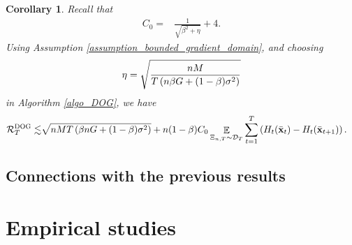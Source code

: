 \documentclass{article}
\newtheorem{Corollary}{\bf{Corollary}}
\newtheorem{Assumption}{\bf{Assumption}}
\begin{document}
\begin{Corollary}
\label{corollary_regret_upper_bound}
Recall that 
\begin{align}
\nonumber
C_0 = & \frac{1}{\sqrt{\beta^2 + \eta}} + 4.
\end{align}
Using Assumption \ref{assumption_bounded_gradient_domain}, and choosing 
\begin{align}
\nonumber
\eta = \sqrt{\frac{nM}{ T\left( n\beta G + (1-\beta)\sigma^2 \right) }}
\end{align} in Algorithm \ref{algo_DOG}, we have
\begin{align}
\nonumber
{\mathcal{R}}_T^{\textsc{DOG}} \lesssim & \sqrt{nMT\left( \beta nG + (1-\beta)\sigma^2 \right)} + n(1-\beta)C_0  \mathop{\mathbb{E}}_{ \Xi_{n,T} \sim \mathcal{D}_{T} } \sum_{t=1}^T  \left( H_t(\bar{{\bf x}}_t) - H_t(\bar{{\bf x}}_{t+1}) \right).
\end{align}

\end{Corollary}




\subsection{Connections with the previous results}










%















\section{Empirical studies}
\end{document}
